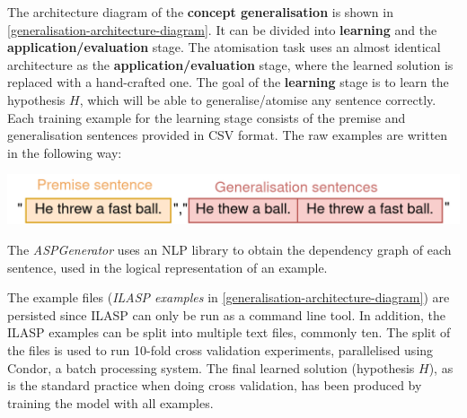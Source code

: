 The architecture diagram of the \textbf{concept generalisation} is shown in \ref{generalisation-architecture-diagram}.
It can be divided into \textbf{learning} and the \textbf{application/evaluation} stage.
The atomisation task uses an almost identical architecture as the \textbf{application/evaluation} stage, where the learned solution is replaced with a hand-crafted one. 
The goal of the \textbf{learning} stage is to learn the hypothesis $H$, which will be able to generalise/atomise any sentence correctly.
Each training example for the learning stage consists of the premise and generalisation sentences provided in CSV format.
The raw examples are written in the following way:
\begin{center}
\setlength\parskip{0pt}
\includegraphics[width=.8\linewidth]{solving-nlp-tasks-logically/raw-generalisation-example.png}
\end{center}

The \textit{ASPGenerator} uses an NLP library to obtain the dependency graph of each sentence, used in the logical representation of an example.

The example files (\textit{ILASP examples} in \ref{generalisation-architecture-diagram}) are persisted since ILASP can only be run as a command line tool.
In addition, the ILASP examples can be split into multiple text files, commonly ten. 
The split of the files is used to run 10-fold cross validation experiments, parallelised using Condor, a batch processing system.
The final learned solution (hypothesis $H$), as is the standard practice when doing cross validation, has been produced by training the model with all examples.


